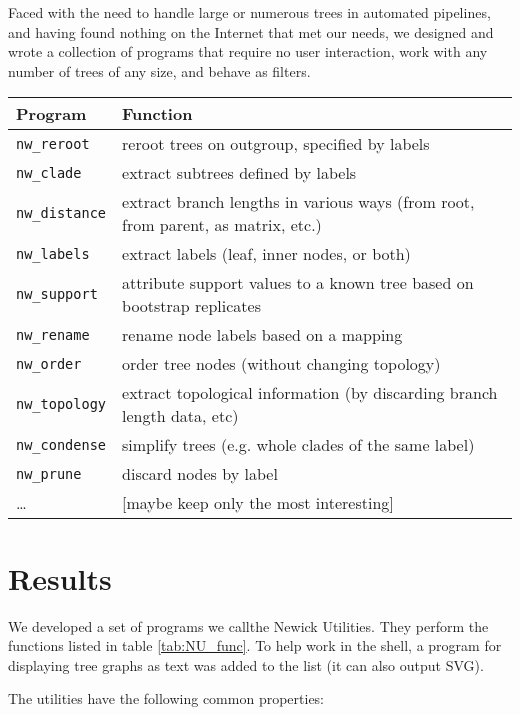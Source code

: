 \documentclass[a4paper,11pt]{article}
\newcommand{\prog}[1]{\texttt{nw\_#1}}
\begin{document}
Faced with the need to handle large or numerous trees in automated pipelines, and having found nothing on the Internet that met our needs, we designed and wrote
a collection of programs that require no user interaction, work with any number of trees of any size, and behave as filters. 

\begin{table*}
\begin{tabular}{lp{}}
Program & Function \\ 
\hline 
\prog{reroot} & reroot trees on outgroup, specified by labels \\
\prog{clade} & extract subtrees defined by labels \\
\prog{distance} & extract branch lengths in various ways (from root, from parent, as matrix, etc.) \\
\prog{labels} & extract labels (leaf, inner nodes, or both) \\
\prog{support} & attribute support values to a known tree based on bootstrap replicates \\
\prog{rename} & rename node labels based on a mapping \\
\prog{order} & order tree nodes (without changing topology) \\
\prog{topology} & extract topological information (by discarding branch length data, etc) \\
\prog{condense} & simplify trees (e.g. whole clades of the same label) \\
\prog{prune} & discard nodes by label \\
 \ldots & [maybe keep only the most interesting] \\
\hline
\end{tabular}
\caption{The Newick Utilities and their functions}
\label{tab:NU_func}
\end{table*}



\section*{Results}

We developed a set of programs we callthe Newick Utilities. They perform the functions listed in table \ref{tab:NU_func}. To help work in the shell, a program for displaying tree graphs as text was added to the list (it can also output SVG).

The utilities have the following common properties:
\end{document}
